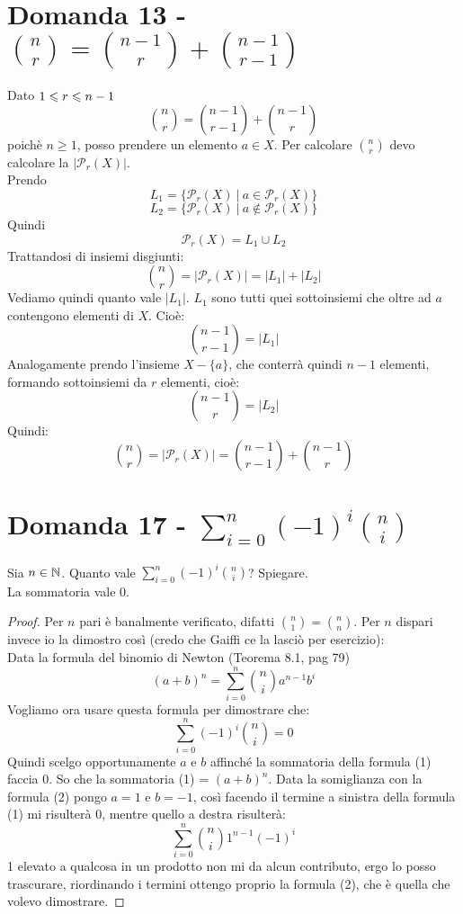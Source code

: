 \documentclass[]{article}
\begin{document}
\section{Domanda 13 - ${n \choose r} = {n-1 \choose r}+{n-1 \choose r-1}$}
Dato $1\leqslant r\leqslant n-1$ $${n \choose r} = {n-1 \choose r-1}+{n-1 \choose r}$$ poichè $n\geqslant1$, posso prendere un elemento $a \in X$. Per calcolare ${n \choose r}$ devo calcolare la $|\mathcal{P}_r(X)|$. \\
Prendo $$L_1 = \{\mathcal{P}_r(X) \ | \ a \in \mathcal{P}_r(X)\}$$
$$ L_2 = \{\mathcal{P}_r(X) \ | \ a \notin \mathcal{P}_r(X)\}$$
Quindi $$\mathcal{P}_r(X) = L_1 \cup L_2 $$
Trattandosi di insiemi disgiunti: 
$${n \choose r} = |\mathcal{P}_r(X) | = |L_1| + |L_2|$$
Vediamo quindi quanto vale $|L_1|$.
$L_1$ sono tutti quei sottoinsiemi che oltre ad $a$ contengono elementi di $X$. Cioè:
$${n-1 \choose r-1} = |L_1|$$
Analogamente prendo l'insieme $X-\{a\}$, che conterrà quindi $n-1$ elementi, formando sottoinsiemi da $r$ elementi, cioè:
$${n-1 \choose r} = |L_2| $$
Quindi:
$${n \choose r} = |\mathcal{P}_r(X)| = {n-1 \choose r-1} + {n-1 \choose r}$$

\section{Domanda 17 - $\sum_{i=0}^n (-1)^i{n\choose i}$ }
Sia $n \in \mathbb{N}$. Quanto vale $\sum_{i=0}^n (-1)^i {n \choose i}$? Spiegare.\\
La sommatoria vale 0.

\begin{proof}
Per $n$ pari è banalmente verificato, difatti ${n \choose 1} = {n \choose n}$. Per $n$ dispari invece io la dimostro così (credo che Gaiffi ce la lasciò per esercizio):\\
Data la formula del binomio di Newton (Teorema 8.1, pag 79) 
\begin{equation}
(a+b)^n = \sum_{i=0}^n {n \choose i} a^{n-1}b^i
\end{equation}
Vogliamo ora usare questa formula per dimostrare che:
\begin{equation}
\sum_{i=0}^n (-1)^i {n \choose i} = 0
\end{equation}
Quindi scelgo opportunamente $a$ e $b$ affinché la sommatoria della formula (1) faccia 0. So che la sommatoria (1) = $(a+b)^n$. Data la somiglianza con la formula (2) pongo $a=1$ e $b=-1$, così facendo il termine a sinistra della formula (1) mi risulterà 0, mentre quello a destra risulterà:
$$\sum_{i=0}^n {n \choose i}  1^{n-1}(-1)^i$$
1 elevato a qualcosa in un prodotto non mi da alcun contributo, ergo lo posso trascurare, riordinando i termini ottengo proprio la formula (2), che è quella che volevo dimostrare. \end{proof}
\end{document}
